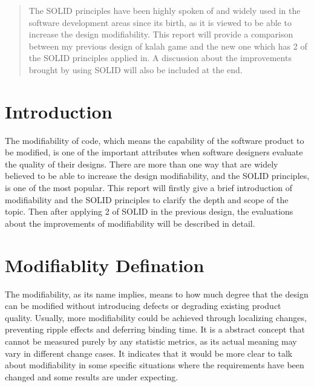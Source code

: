 \documentclass[conference]{IEEEtran}
\begin{document}
\maketitle

\begin{abstract}
The SOLID principles have been highly spoken of and widely used in the software development areas since its birth, as it is viewed to be able to increase the design modifiability. This report will provide a comparison between my previous design of kalah game and the new one which has 2 of the SOLID principles applied in. A discussion about the improvements brought by using SOLID will also be included at the end.
\end{abstract}





%
\IEEEpeerreviewmaketitle



\section{Introduction}
The modifiability of code, which means the capability of the software product to be modified, is one of the important attributes when software designers evaluate the quality of their designs. There are more than one way that are widely believed to be able to increase the design modifiability, and the SOLID principles, is one of the most popular. This report will firstly give a brief introduction of modifiability and the SOLID principles to clarify the depth and scope of the topic. Then after applying 2 of SOLID in the previous design, the evaluations about the improvements of modifiability will be described in detail.

\section{Modifiablity Defination}

The modifiability, as its name implies, means to how much degree that the design can be modified without introducing defects or degrading existing product quality. Usually, more modifiability could be achieved through localizing changes, preventing ripple effects and deferring binding time. It is a abstract concept that cannot be measured purely by any statistic metrics, as its actual meaning may vary in different change cases. It indicates that it would be more clear to talk about modifiability in some specific situations where the requirements have been changed and some results are under expecting.
\end{document}
